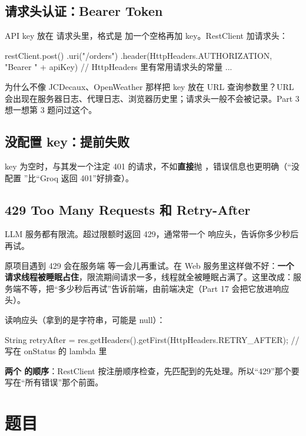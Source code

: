 \subsection{请求头认证：Bearer Token}

API key 放在  请求头里，格式是  加一个空格再加 key。RestClient 加请求头：

\begin{java}
restClient.post()
        .uri("/orders")
        .header(HttpHeaders.AUTHORIZATION, "Bearer " + apiKey)   // HttpHeaders 里有常用请求头的常量
        ...
\end{java}

为什么不像 JCDecaux、OpenWeather 那样把 key 放在 URL 查询参数里？URL 会出现在服务器日志、代理日志、浏览器历史里；请求头一般不会被记录。Part 3 想一想第 3 题问过这个。

\subsection{没配置 key：提前失败}

key 为空时，与其发一个注定 401 的请求，不如\textbf{直接}抛 ，错误信息也更明确（“没配置 ”比“Groq 返回 401”好排查）。

\subsection{429 Too Many Requests 和 Retry-After}

LLM 服务都有限流。超过限额时返回 429，通常带一个  响应头，告诉你多少秒后再试。

原项目遇到 429 会在服务端  等一会儿再重试。在 Web 服务里这样做不好：\textbf{一个请求线程被睡眠占住}，限流期间请求一多，线程就全被睡眠占满了。这里改成：服务端不等，把“多少秒后再试”告诉前端，由前端决定（Part 17 会把它放进响应头）。

读响应头（拿到的是字符串，可能是 null）：
\begin{java}
String retryAfter = res.getHeaders().getFirst(HttpHeaders.RETRY_AFTER);   // 写在 onStatus 的 lambda 里
\end{java}

\textbf{两个  的顺序}：RestClient 按注册顺序检查，先匹配到的先处理。所以“429”那个要写在“所有错误”那个前面。

\section{题目}

